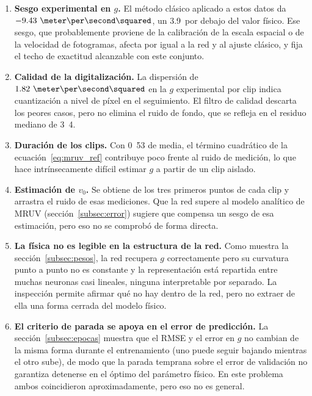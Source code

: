 \documentclass[titlepage,11pt]{article}
\providecommand{\num}[1]{\ensuremath{#1}}
\providecommand{\SI}[2]{#1\,#2}
\providecommand{\percent}{\char37\relax}
\begin{document}
\begin{enumerate}
\item \textbf{Sesgo experimental en $g$.} El método clásico aplicado a estos
  datos da $\num{-9.43}~\meter\per\second\squared$, un \SI{3.9}{\percent} por
  debajo del valor físico. Ese sesgo, que probablemente proviene de la
  calibración de la escala espacial o de la velocidad de fotogramas, afecta por
  igual a la red y al ajuste clásico, y fija el techo de exactitud alcanzable
  con este conjunto.

\item \textbf{Calidad de la digitalización.} La dispersión de
  $\num{1.82}~\meter\per\second\squared$ en la $g$ experimental por clip indica
  cuantización a nivel de píxel en el seguimiento. El filtro de calidad
  descarta los peores casos, pero no elimina el ruido de fondo, que se refleja
  en el residuo mediano de \unit{3.4}{\centi\meter}.

\item \textbf{Duración de los clips.} Con \unit{0.53}{\second} de media, el
  término cuadrático de la ecuación~\eqref{eq:mruv_ref} contribuye poco frente
  al ruido de medición, lo que hace intrínsecamente difícil estimar $g$ a
  partir de un clip aislado.

\item \textbf{Estimación de $v_0$.} Se obtiene de los tres primeros puntos de
  cada clip y arrastra el ruido de esas mediciones. Que la red supere al modelo
  analítico de MRUV (sección~\ref{subsec:error}) sugiere que compensa un sesgo
  de esa estimación, pero eso no se comprobó de forma directa.

\item \textbf{La física no es legible en la estructura de la red.} Como muestra
  la sección~\ref{subsec:pesos}, la red recupera $g$ correctamente pero su
  curvatura punto a punto no es constante y la representación está repartida
  entre muchas neuronas casi lineales, ninguna interpretable por separado. La
  inspección permite afirmar qué no hay dentro de la red, pero no extraer de
  ella una forma cerrada del modelo físico.

\item \textbf{El criterio de parada se apoya en el error de predicción.} La
  sección~\ref{subsec:epocas} muestra que el RMSE y el error en $g$ no cambian de la misma forma durante el entrenamiento (uno puede seguir
  bajando mientras el otro sube), de modo que la parada temprana sobre el error de
  validación no garantiza detenerse en el óptimo del parámetro físico. En este
  problema ambos coincidieron aproximadamente, pero eso no es general.
\end{enumerate}
\end{document}
